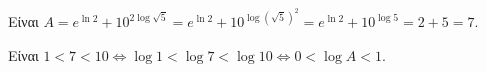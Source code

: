 \begin{alist}
\item Είναι $A = e^{\ln 2} + 10^{2\log\sqrt{5}} = e^{\ln 2} + 10^{\log(\sqrt{5})^2} = e^{\ln 2} + 10^{\log 5} = 2 + 5 = 7$.
\item Είναι $1 < 7 < 10 \Leftrightarrow \log 1 < \log 7 < \log 10 \Leftrightarrow 0 < \log A < 1$.
\end{alist}

